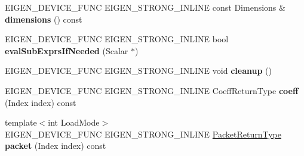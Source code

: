 \begin{DoxyCompactItemize}
\mbox{\label{struct_eigen_1_1_tensor_evaluator_3_01const_01_tensor_generator_op_3_01_generator_00_01_arg_type_01_4_00_01_device_01_4_a339bd2718544e687abf75a9dc1d2a6ad}} 
E\+I\+G\+E\+N\+\_\+\+D\+E\+V\+I\+C\+E\+\_\+\+F\+U\+NC E\+I\+G\+E\+N\+\_\+\+S\+T\+R\+O\+N\+G\+\_\+\+I\+N\+L\+I\+NE const Dimensions \& {\bfseries dimensions} () const
\item 
\mbox{\label{struct_eigen_1_1_tensor_evaluator_3_01const_01_tensor_generator_op_3_01_generator_00_01_arg_type_01_4_00_01_device_01_4_a5602f7f9e6fa0d77e6fe0fd76a90bbf9}} 
E\+I\+G\+E\+N\+\_\+\+D\+E\+V\+I\+C\+E\+\_\+\+F\+U\+NC E\+I\+G\+E\+N\+\_\+\+S\+T\+R\+O\+N\+G\+\_\+\+I\+N\+L\+I\+NE bool {\bfseries eval\+Sub\+Exprs\+If\+Needed} (Scalar $\ast$)
\item 
\mbox{\label{struct_eigen_1_1_tensor_evaluator_3_01const_01_tensor_generator_op_3_01_generator_00_01_arg_type_01_4_00_01_device_01_4_aa16151c74edae4bf0720452c12d0995c}} 
E\+I\+G\+E\+N\+\_\+\+D\+E\+V\+I\+C\+E\+\_\+\+F\+U\+NC E\+I\+G\+E\+N\+\_\+\+S\+T\+R\+O\+N\+G\+\_\+\+I\+N\+L\+I\+NE void {\bfseries cleanup} ()
\item 
\mbox{\label{struct_eigen_1_1_tensor_evaluator_3_01const_01_tensor_generator_op_3_01_generator_00_01_arg_type_01_4_00_01_device_01_4_af457e0e07e1c2b75a4e01b2739d06420}} 
E\+I\+G\+E\+N\+\_\+\+D\+E\+V\+I\+C\+E\+\_\+\+F\+U\+NC E\+I\+G\+E\+N\+\_\+\+S\+T\+R\+O\+N\+G\+\_\+\+I\+N\+L\+I\+NE Coeff\+Return\+Type {\bfseries coeff} (Index index) const
\item 
\mbox{\label{struct_eigen_1_1_tensor_evaluator_3_01const_01_tensor_generator_op_3_01_generator_00_01_arg_type_01_4_00_01_device_01_4_a8db758a45389324db69f398291725809}} 
{\footnotesize template$<$int Load\+Mode$>$ }\\E\+I\+G\+E\+N\+\_\+\+D\+E\+V\+I\+C\+E\+\_\+\+F\+U\+NC E\+I\+G\+E\+N\+\_\+\+S\+T\+R\+O\+N\+G\+\_\+\+I\+N\+L\+I\+NE \hyperlink{group___sparse_core___module}{Packet\+Return\+Type} {\bfseries packet} (Index index) const

\end{DoxyCompactItemize}

